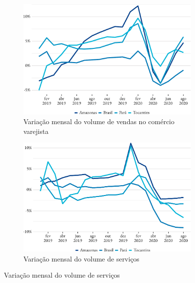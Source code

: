 \begin{figure}[!h]
	\begin{subfigure}{\linewidth}
		\caption{Variação mensal do volume de vendas no comércio varejista}
		\label{fig:pmc}
		\includegraphics{fig/pmc_ibge-1.pdf}
	\end{subfigure}
	\begin{subfigure}{\linewidth}
		\caption{Variação mensal do volume de serviços}
		\label{fig:pms}
		\includegraphics{fig/pms_ibge-1.pdf}
	\end{subfigure}
\end{figure}